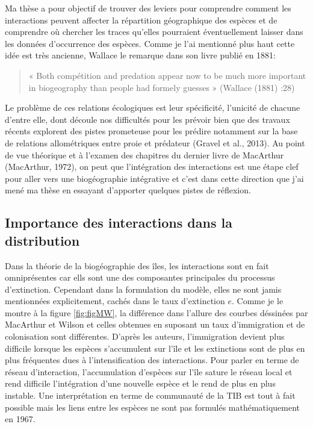 Ma thèse a pour objectif de trouver des leviers pour comprendre comment
les interactions peuvent affecter la répartition géographique des
espèces et de comprendre où chercher les traces qu'elles pourraient
éventuellement laisser dans les données d'occurrence des espèces. Comme
je l'ai mentionné plus haut cette idée est très ancienne, Wallace le
remarque dans son livre publié en 1881:

\begin{quote}
« Both compétition and predation appear now to be much more important in
biogeography than people had formely guesses » (Wallace (1881) :28)
\end{quote}

Le problème de ces relations écologiques est leur spécificité, l'unicité
de chacune d'entre elle, dont découle nos difficultés pour les prévoir
bien que des travaux récents explorent des pistes prometeuse pour les
prédire notamment sur la base de relations allométriques entre proie et
prédateur (Gravel et al., 2013). Au point de vue théorique et à l'examen
des chapitres du dernier livre de MacArthur (MacArthur, 1972), on peut
que l'intégration des interactions est une étape clef pour aller vers
une biogéographie intégrative et c'est dans cette direction que j'ai
mené ma thèse en essayant d'apporter quelques pistes de réflexion.

\subsection*{Importance des interactions dans la
distribution}\label{importance-des-interactions-dans-la-distribution}

Dans la théorie de la biogéographie des îles, les interactions sont en
fait omniprésentes car ells sont une des composantes principales du
processus d'extinction. Cependant dans la formulation du modèle, elles
ne sont jamis mentionnées explicitement, cachés dans le taux
d'extinction \(e\). Comme je le montre à la figure
\protect\renewcommand{\plusnamesingular}{fig.}\cref{fig:figMW}, la
différence dans l'allure des courbes déssinées par MacArthur et Wilson
et celles obtenues en suposant un taux d'immigration et de colonisation
sont différentes. D'après les auteurs, l'immigration devient plus
difficile lorsque les espèces s'accumulent sur l'île et les extinctions
sont de plus en plus fréquentes dues à l'intensification des
interactions. Pour parler en terme de réseau d'interaction,
l'accumulation d'espèces sur l'île sature le réseau local et rend
difficile l'intégration d'une nouvelle espèce et le rend de plus en plus
instable. Une interprétation en terme de communauté de la TIB est tout à
fait possible mais les liens entre les espèces ne sont pas formulés
mathématiquement en 1967.


